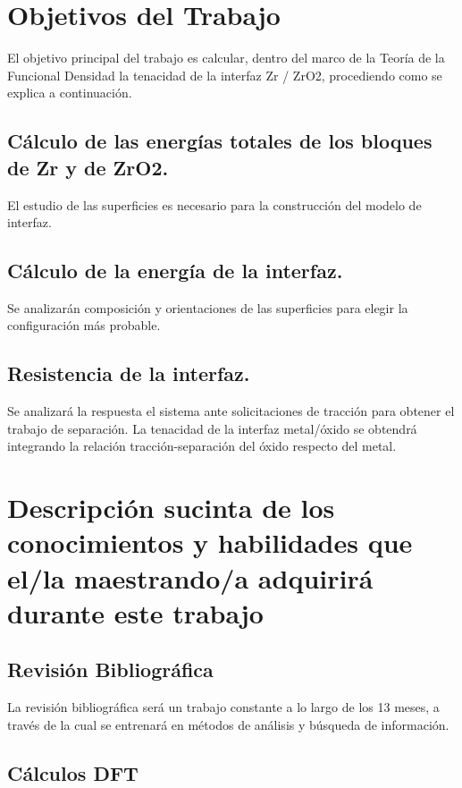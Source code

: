 \section{Objetivos del Trabajo}

El objetivo principal del trabajo es calcular, dentro del marco de la Teoría de 
la Funcional Densidad la tenacidad de la interfaz Zr / ZrO2, procediendo como
se explica a continuación.

\subsection{ Cálculo de las energías totales de los bloques de Zr y de ZrO2.}

El estudio de las superficies es necesario para la construcción del modelo de 
interfaz.

\subsection{ Cálculo de la energía de la interfaz.}

Se analizarán composición y orientaciones de las superficies para elegir la 
configuración más probable.

\subsection{Resistencia de la interfaz.}

 Se analizará la respuesta el sistema ante solicitaciones de tracción para 
obtener el trabajo de separación. La tenacidad de la interfaz metal/óxido se 
obtendrá integrando la relación tracción-separación del óxido respecto del 
metal.

\section{Descripción sucinta de los conocimientos y habilidades que el/la  
maestrando/a adquirirá durante este trabajo }

\subsection{ Revisión Bibliográfica}

La revisión bibliográfica será un trabajo constante a lo largo de los 13 meses, 
a través de la cual se entrenará en métodos de análisis y búsqueda de 
información.

\subsection{ Cálculos DFT}

